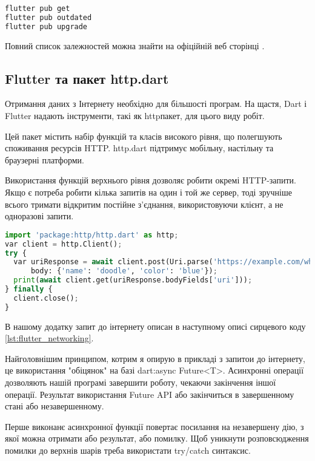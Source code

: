 \begin{lstlisting}[style=light, language=Python,label={lst:flutter_pub},caption=Flutter Dependency Resolution]
flutter pub get
flutter pub outdated
flutter pub upgrade
\end{lstlisting}

Повний список залежностей можна знайти на офіційній веб сторінці \cite{flutter_cli}.

\subsection{Flutter та пакет http.dart}
\label{subsec:flutter_http_dart_theory}
Отримання даних з Інтернету необхідно для більшості програм.
На щастя, Dart і Flutter надають інструменти, такі як httpпакет, для цього виду робіт.

Цей пакет містить набір функцій та класів високого рівня, що полегшують споживання ресурсів HTTP.
http.dart підтримує мобільну, настільну та браузерні платформи.

Використання функцій верхнього рівня дозволяє робити окремі HTTP-запити.
Якщо є потреба робити кілька запитів на один і той же сервер, тоді зручніше всього тримати відкритим постійне з’єднання,
використовуючи клієнт, а не одноразові запити.

\begin{lstlisting}[style=light, language=Python,label={lst:flutter_pub},caption=Flutter Dependency Resolution]
import 'package:http/http.dart' as http;
var client = http.Client();
try {
  var uriResponse = await client.post(Uri.parse('https://example.com/whatsit/create'),
      body: {'name': 'doodle', 'color': 'blue'});
  print(await client.get(uriResponse.bodyFields['uri']));
} finally {
  client.close();
}
\end{lstlisting}

В нашому додатку запит до інтернету описан в наступному описі сирцевого коду \ref{lst:flutter_networking}.

Найголовнішим принципом, котрим я опирую в прикладі з запитои до інтернету, це використання "обіцянок" на базі dart:async Future<T>.
Асинхронні операції дозволяють нашій програмі завершити роботу, чекаючи закінчення іншої операції.
Результат використання Future API або закінчиться в завершенному стані або незавершенному.

Перше виконанє асинхронної функції повертає посилання на незавершену дію, з якої можна отримати або результат, або помилку.
Щоб уникнути розповсюдження помилки до верхнів шарів треба використати try/catch синтаксис.

